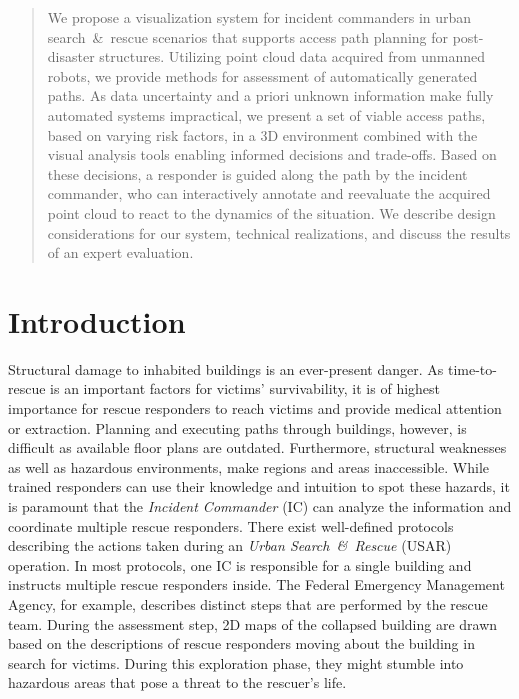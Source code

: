 \documentclass{egpubl}
\begin{document}
\begin{abstract}
We propose a visualization system for incident commanders in urban search~\&~rescue scenarios that supports access path planning for post-disaster structures. Utilizing point cloud data acquired from unmanned robots, we provide methods for assessment of automatically generated paths. As data uncertainty and a priori unknown information make fully automated systems impractical, we present a set of viable access paths, based on varying risk factors, in a 3D environment combined with the visual analysis tools enabling informed decisions and trade-offs. Based on these decisions, a responder is guided along the path by the incident commander, who can interactively annotate and reevaluate the acquired point cloud to react to the dynamics of the situation. We describe design considerations for our system, technical realizations, and discuss the results of an expert evaluation.

\begin{classification}
\end{classification}


\end{abstract}

\section{Introduction}

Structural damage to inhabited buildings is an ever-present danger. As time-to-rescue is an important factors for victims' survivability, it is of highest importance for rescue responders to reach victims and provide medical attention or extraction. Planning and executing paths through buildings, however, is difficult as available floor plans are outdated. Furthermore, structural weaknesses as well as hazardous environments, make regions and areas inaccessible. While trained responders can use their knowledge and intuition to spot these hazards, it is paramount that the \emph{Incident Commander} (IC) can analyze the information and coordinate multiple rescue responders. There exist well-defined protocols describing the actions taken during an \emph{Urban Search~\&~Rescue} (USAR) operation. In most protocols, one IC is responsible for a single building and instructs multiple rescue responders inside. The Federal Emergency Management Agency, for example, describes distinct steps that are performed by the rescue team. During the assessment step, 2D maps of the collapsed building are drawn based on the descriptions of rescue responders moving about the building in search for victims. During this exploration phase, they might stumble into hazardous areas that pose a threat to the rescuer's life.
\end{document}
